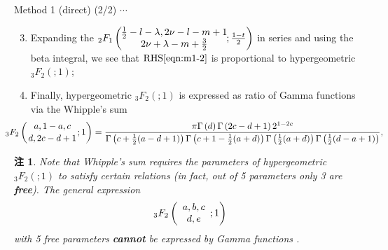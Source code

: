 \documentclass[pdf,notes]{beamer}
\newtheorem{remark}{注}
\begin{document}
\begin{frame}{Method 1 (direct) (2/2)}
	\scriptsize
	$\cdots$
	\begin{enumerate}
			\setcounter{enumi}{2}
	\item Expanding the ${}_2 F_1 \left( \kern-0.2cm\begin{array}{c}
					\frac{1}{2}-l-\lambda, 2\nu-l-m+1\\
					2 \nu+\lambda-m+\frac{3}{2}
				\end{array}\kern-0.2cm ; \frac{1 - t}{2} \right)$ in series and using the beta integral, we see that $\mbox{RHS}\eqref{eqn:m1-2}$
				is proportional to hypergeometric ${}_3F_2(;1)$;
			\item Finally, hypergeometric ${}_3F_2(;1)$ is expressed as ratio of Gamma functions via the Whipple's sum
			\vspace{-0.2cm}
			\begin{equation*}
		\kern-1cm{}_{3}F_{2}\left({a,1-a,c\atop d,2c-d+1};1\right)=\frac{\pi\Gamma\left(d%
				\right)\Gamma\left(2c-d+1\right)2^{1-2c}}{\Gamma\left(c+\frac{1}{2}(a-d+1)%
				\right)\Gamma\left(c+1-\frac{1}{2}(a+d)\right)\Gamma\left(\frac{1}{2}(a+d)%
			\right)\Gamma\left(\frac{1}{2}(d-a+1)\right)},
		\end{equation*}
	\end{enumerate}
	\begin{remark}
		Note that Whipple's sum requires the parameters of hypergeometric ${}_3F_2(;1)$ to satisfy certain relations (in fact, out of 5 parameters only 3 are {\bf free}).
		The general expression \begin{equation*}
			{}_3F_2\left( \begin{array}[]{c}
				a,b,c\\d,e
			\end{array};1 \right)
		\end{equation*}
		with 5 free parameters {\bf cannot} be expressed by Gamma functions \cite{ebisu2016three}.
	\end{remark}
\end{frame}
\end{document}
